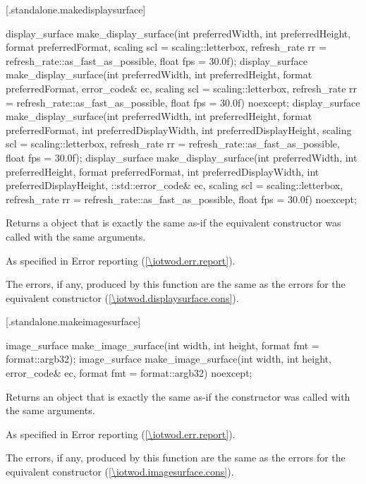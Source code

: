  [\iotwod.standalone.makedisplaysurface] {}

%
\begin{itemdecl}
display_surface make_display_surface(int preferredWidth,
  int preferredHeight, format preferredFormat,
  scaling scl = scaling::letterbox,
  refresh_rate rr = refresh_rate::as_fast_as_possible, float fps = 30.0f);
display_surface make_display_surface(int preferredWidth,
  int preferredHeight, format preferredFormat, error_code& ec,
  scaling scl = scaling::letterbox,
  refresh_rate rr = refresh_rate::as_fast_as_possible, float fps = 30.0f) 
  noexcept;
display_surface make_display_surface(int preferredWidth,
  int preferredHeight, format preferredFormat, int preferredDisplayWidth, 
  int preferredDisplayHeight, scaling scl = scaling::letterbox,
  refresh_rate rr = refresh_rate::as_fast_as_possible, float fps = 30.0f);
display_surface make_display_surface(int preferredWidth,
  int preferredHeight, format preferredFormat, int preferredDisplayWidth, 
  int preferredDisplayHeight, ::std::error_code& ec,
  scaling scl = scaling::letterbox,
  refresh_rate rr = refresh_rate::as_fast_as_possible, float fps = 30.0f) 
  noexcept;
\end{itemdecl}
\begin{itemdescr}
\pnum
\returns
Returns a  object that is exactly the same as-if the equivalent  constructor was called with the same arguments.

\pnum
\throws
As specified in Error reporting (\ref{\iotwod.err.report}).

\pnum
\errors
The errors, if any, produced by this function are the same as the errors for the equivalent  constructor (\ref{\iotwod.displaysurface.cons}).
\end{itemdescr}

 [\iotwod.standalone.makeimagesurface] {}

%
\begin{itemdecl}
image_surface make_image_surface(int width, int height,
  format fmt = format::argb32);
image_surface make_image_surface(int width, int height,
  error_code& ec, format fmt = format::argb32) noexcept;
\end{itemdecl}
\begin{itemdescr}
\pnum
\returns
Returns an  object that is exactly the same as-if the  constructor was called with the same arguments.

\pnum
\throws
As specified in Error reporting (\ref{\iotwod.err.report}).

\pnum
\errors
The errors, if any, produced by this function are the same as the errors for the equivalent  constructor (\ref{\iotwod.imagesurface.cons}).
\end{itemdescr}

